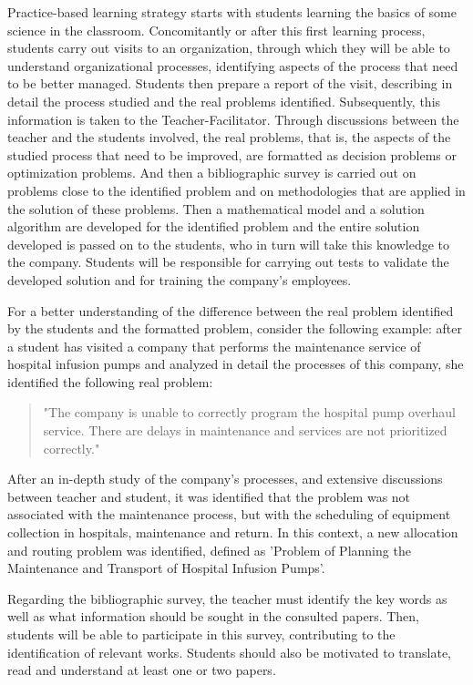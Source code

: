 \documentclass[preprint,12pt,authoryear]{elsarticle}
\begin{document}
Practice-based learning strategy starts with students learning the basics of some science in the classroom. Concomitantly or after this first learning process, students carry out visits to an organization, through which they will be able to understand organizational processes, identifying aspects of the process that need to be better managed. Students then prepare a report of the visit, describing in detail the process studied and the real problems identified. Subsequently, this information is taken to the Teacher-Facilitator. Through discussions between the teacher and the students involved, the real problems, that is, the aspects of the studied process that need to be improved, are formatted as decision problems or optimization problems. And then a bibliographic survey is carried out on problems close to the identified problem and on methodologies that are applied in the solution of these problems. Then a mathematical model and a solution algorithm are developed for the identified problem and the entire solution developed is passed on to the students, who in turn will take this knowledge to the company. Students will be responsible for carrying out tests to validate the developed solution and for training the company's employees.

For a better understanding of the difference between the real problem identified by the students and the formatted problem, consider the following example: after a student has visited a company that performs the maintenance service of hospital infusion pumps and analyzed in detail the processes of this company, she identified the following real problem:

\begin{quote}
"The company is unable to correctly program the hospital pump overhaul service. There are delays in maintenance and services are not prioritized correctly."
\end{quote}

After an in-depth study of the company's processes, and extensive discussions between teacher and student, it was identified that the problem was not associated with the maintenance process, but with the scheduling of equipment collection in hospitals, maintenance and return. In this context, a new allocation and routing problem was identified, defined as 'Problem of Planning the Maintenance and Transport of Hospital Infusion Pumps'.

Regarding the bibliographic survey, the teacher must identify the key words as well as what information should be sought in the consulted papers. Then, students will be able to participate in this survey, contributing to the identification of relevant works. Students should also be motivated to translate, read and understand at least one or two papers. 
\end{document}
